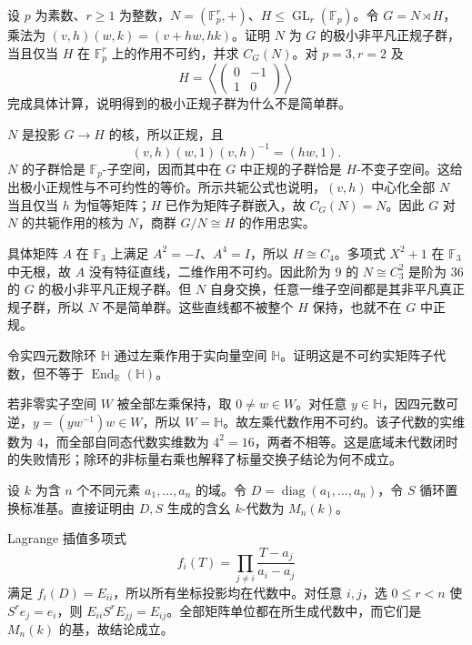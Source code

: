 \begin{exercise}\label{b5:ex:05-minimal-normal-linear}
	设 \(p\) 为素数、\(r\ge1\) 为整数，\(N=(\mathbb F_p^r,+)\)、\(H\le\operatorname{GL}_r(\mathbb F_p)\)。令 \(G=N\rtimes H\)，乘法为 \((v,h)(w,k)=(v+hw,hk)\)。证明 \(N\) 为 \(G\) 的极小非平凡正规子群，当且仅当 \(H\) 在 \(\mathbb F_p^r\) 上的作用不可约，并求 \(C_G(N)\)。对 \(p=3,r=2\) 及
	\[
		H=\left\langle\begin{pmatrix}0&-1\\1&0\end{pmatrix}\right\rangle
	\]
	完成具体计算，说明得到的极小正规子群为什么不是简单群。
\end{exercise}
\begin{solution}
	\(N\) 是投影 \(G\rightarrow H\) 的核，所以正规，且
	\[
		(v,h)(w,1)(v,h)^{-1}=(hw,1).
	\]
	\(N\) 的子群恰是 \(\mathbb F_p\)-子空间，因而其中在 \(G\) 中正规的子群恰是 \(H\)-不变子空间。这给出极小正规性与不可约性的等价。所示共轭公式也说明，\((v,h)\) 中心化全部 \(N\) 当且仅当 \(h\) 为恒等矩阵；\(H\) 已作为矩阵子群嵌入，故 \(C_G(N)=N\)。因此 \(G\) 对 \(N\) 的共轭作用的核为 \(N\)，商群 \(G/N\cong H\) 的作用忠实。

	具体矩阵 \(A\) 在 \(\mathbb F_3\) 上满足 \(A^2=-I\)、\(A^4=I\)，所以 \(H\cong C_4\)。多项式 \(X^2+1\) 在 \(\mathbb F_3\) 中无根，故 \(A\) 没有特征直线，二维作用不可约。因此阶为 \(9\) 的 \(N\cong C_3^2\) 是阶为 \(36\) 的 \(G\) 的极小非平凡正规子群。但 \(N\) 自身交换，任意一维子空间都是其非平凡真正规子群，所以 \(N\) 不是简单群。这些直线都不被整个 \(H\) 保持，也就不在 \(G\) 中正规。
\end{solution}

\begin{exercise}\label{b5:ex:05-real-quaternion-density}
	令实四元数除环 \(\mathbb H\) 通过左乘作用于实向量空间 \(\mathbb H\)。证明这是不可约实矩阵子代数，但不等于 \(\operatorname{End}_{\mathbb R}(\mathbb H)\)。
\end{exercise}
\begin{solution}
	若非零实子空间 \(W\) 被全部左乘保持，取 \(0\ne w\in W\)。对任意 \(y\in\mathbb H\)，因四元数可逆，\(y=(yw^{-1})w\in W\)，所以 \(W=\mathbb H\)。故左乘代数作用不可约。该子代数的实维数为 \(4\)，而全部自同态代数实维数为 \(4^2=16\)，两者不相等。这是底域未代数闭时的失败情形；除环的非标量右乘也解释了标量交换子结论为何不成立。
\end{solution}

\begin{exercise}\label{b5:ex:05-explicit-matrix-generation}
	设 \(k\) 为含 \(n\) 个不同元素 \(a_1,\ldots,a_n\) 的域。令 \(D=\operatorname{diag}(a_1,\ldots,a_n)\)，令 \(S\) 循环置换标准基。直接证明由 \(D,S\) 生成的含幺 \(k\)-代数为 \(M_n(k)\)。
\end{exercise}
\begin{solution}
	Lagrange 插值多项式
	\[
		f_i(T)=\prod_{j\ne i}\frac{T-a_j}{a_i-a_j}
	\]
	满足 \(f_i(D)=E_{ii}\)，所以所有坐标投影均在代数中。对任意 \(i,j\)，选 \(0\le r<n\) 使 \(S^r e_j=e_i\)，则 \(E_{ii}S^rE_{jj}=E_{ij}\)。全部矩阵单位都在所生成代数中，而它们是 \(M_n(k)\) 的基，故结论成立。
\end{solution}

